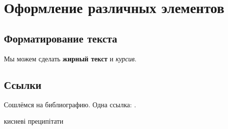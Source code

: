\documentclass[a4paper,14pt,oneside,openany]{memoir}
\begin{document}
\chapter{Оформление различных элементов} \label{chapt1}

\section{Форматирование текста} \label{sect1_1}


Мы можем сделать \textbf{жирный текст} и \textit{курсив}.


\section{Ссылки} \label{sect1_2}
Сошлёмся на библиографию.
\cite{Olikh:Visn2003,Olikh:SPQEO2003,Olikh:SEMT2004,Olikh:PJE2004,Olikh:PhChOM2005,
Olikh:PZTF2006,Olikh:MRS2007,Olikh:SEMT2007,Olikh:Visn2007,Olikh:FTP2009,Olikh:SPQEO2010,Gorb2010,
Olikh:UPJ2010,Olikh:SEMT2011,Olikh:FTP2011,Olikh:2013IEEE,Olikh:UPJ2013,Olikh:FTP2013,Olikh:SEMT2013,
Olikh:UPJ2014,Olikh:Ultras,OlikhJAP,Olikh:Rev,Olikh:Ultras2016,Olikh2016JSem,Olikh2018JAP,
1UNCPS,3Tomsk,1SEMST,50IUFFC,9APTTE,2005IUS,ICU2007SC,ICU2007GA,2007MRS,3UNCPS,6DrogGorb,6Drog,
12IvFr,4UNCPS,4Kremen,7Drog,5UNCPS,2012Ternop,14Plivk,8Drog,2013Buk,6UNCPS,2014IUSOl,2014IUS,6SEMST,
2015ICU,6CPFCS,7UNCPS,2017MEICS}
Одна ссылка: \cite[с.~54]{OlikhJAP}.


кисневі преципітати \cite{SiO:Mchedlidze,SiO:Hwang,SiO:Vanhell,SiO:Chan,SiO:Miyagi}

\end{document}
